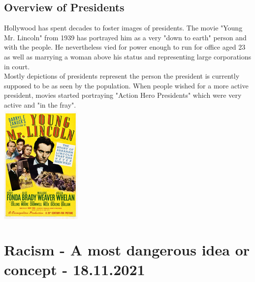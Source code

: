 \documentclass{article}
\begin{document}
	\subsection{Overview of Presidents}
	Hollywood has spent decades to foster images of presidents. The movie "Young Mr. Lincoln" from 1939 has portrayed him as a very "down to earth" person and with the people. He nevertheless vied for power enough to run for office aged 23 as well as marrying a woman above his status and representing large corporations in court. \\
	Mostly depictions of presidents represent the person the president is currently supposed to be as seen by the population. When people wished for a more active president, movies started portraying "Action Hero Presidents" which were very active and "in the fray". \\
	\includegraphics{Lincoln_tiny.jpg}
	\newpage

	\section{Racism - A most dangerous idea or concept - \textbf{18.11.2021}}
\end{document}
